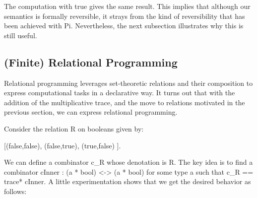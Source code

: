 \documentclass{llncs}
\begin{document}
\noindent  The computation with {{true}} gives the same result.  This
implies that although our semantics is formally reversible, it 
strays from the kind of reversibility that has been achieved with {{Pi}}.
Nevertheless, the next subsection illustrates why this is still useful.

\subsection{(Finite) Relational Programming}
\label{ch3:sec:lp}

Relational programming leverages set-theoretic relations and their
composition to express computational tasks in a declarative way. 
It turns out that with the addition of the multiplicative trace, and
the move to relations motivated in the previous section, we can
express relational programming.

Consider the relation {{R}} on booleans given by:

{{ {[(false,false), (false,true), (true,false) ]}. }}

\noindent We can define a combinator {{c_R}} whose denotation is {{R}}.
The key idea is to find a combinator {{cInner : (a * bool) <-> (a * bool)}}
for some type {{a}} such that {{c_R}} == {{trace* cInner}}.
A little experimentation shows that we get the desired behavior 
as follows:
\end{document}
